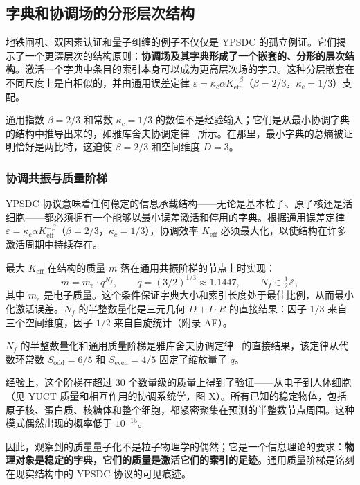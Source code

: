\documentclass[12pt,a4paper]{article}
\theoremstyle{remark}
\begin{document}
	\subsection{字典和协调场的分形层次结构}
	\label{subsec:fractal-hierarchy}
	
	地铁闸机、双因素认证和量子纠缠的例子不仅仅是 YPSDC 的孤立例证。它们揭示了一个更深层次的结构原则：\textbf{协调场及其字典形成了一个嵌套的、分形的层次结构}。激活一个字典中条目的索引本身可以成为更高层次场的字典。这种分层嵌套在不同尺度上是自相似的，并由通用误差定律 $\varepsilon = \kappa_c \alpha K_{\mathrm{eff}}^{-\beta}$（$\beta=2/3$，$\kappa_c=1/3$）支配。
	
	通用指数 \(\beta = 2/3\) 和常数 \(\kappa_c = 1/3\) 的数值不是经验输入；它们是从最小协调字典的结构中推导出来的，如雅库舍夫协调定律~\cite{YakushevLaw2026} 所示。在那里，最小字典的总熵被证明恰好是两比特，这迫使 \(\beta = 2/3\) 和空间维度 \(D = 3\)。
	
	\subsubsection{协调共振与质量阶梯}
	
	YPSDC 协议意味着任何稳定的信息承载结构——无论是基本粒子、原子核还是活细胞——都必须拥有一个能够以最小误差激活和停用的字典。根据通用误差定律 \(\varepsilon = \kappa_c\alpha K_{\mathrm{eff}}^{-\beta}\)（\(\beta = 2/3\)，\(\kappa_c = 1/3\)），协调效率 \(K_{\mathrm{eff}}\) 必须最大化，以使结构在许多激活周期中持续存在。
	
	最大 \(K_{\mathrm{eff}}\) 在结构的质量 \(m\) 落在通用共振阶梯的节点上时实现：
	\[
	m = m_e \cdot q^{N_f}, \qquad
	q = (3/2)^{1/3} \approx 1.1447, \qquad N_f \in \tfrac{1}{2}\mathbb{Z},
	\]
	其中 \(m_e\) 是电子质量。这个条件保证字典大小和索引长度处于最佳比例，从而最小化激活误差。\(N_f\) 的半整数量化是三元几何 \(D+I\!\cdot\!R\) 的直接结果：因子 \(1/3\) 来自三个空间维度，因子 \(1/2\) 来自自旋统计（附录 AF）。
	
	\(N_f\) 的半整数量化和通用质量阶梯是雅库舍夫协调定律~\cite{YakushevLaw2026} 的直接结果，该定律从代数环常数 \(S_{\mathrm{odd}} = 6/5\) 和 \(S_{\mathrm{even}} = 4/5\) 固定了缩放量子 \(q\)。
	
	经验上，这个阶梯在超过 30 个数量级的质量上得到了验证——从电子到人体细胞（见 YUCT 质量和相互作用的协调系统学，图 X）。所有已知的稳定物体，包括原子核、蛋白质、核糖体和整个细胞，都紧密聚集在预测的半整数节点周围。这种模式偶然出现的概率低于 \(10^{-15}\)。
	
	因此，观察到的质量量子化不是粒子物理学的偶然；它是一个信息理论的要求：\textbf{物理对象是稳定的字典，它们的质量是激活它们的索引的足迹}。通用质量阶梯是铭刻在现实结构中的 YPSDC 协议的可见痕迹。
	
\end{document}
